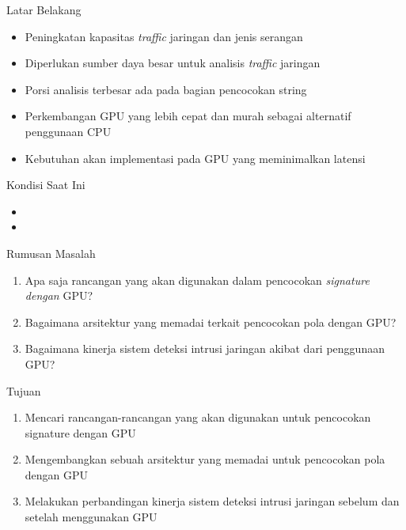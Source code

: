 \documentclass[10pt]{beamer}
\begin{document}
\begin{frame}[fragile]{Latar Belakang}
    \begin{itemize}

        \item Peningkatan kapasitas \emph{traffic} jaringan dan jenis serangan

        \item Diperlukan sumber daya besar untuk analisis \emph{traffic} jaringan

        \item Porsi analisis terbesar ada pada bagian pencocokan string

        \item Perkembangan GPU yang lebih cepat dan murah sebagai alternatif 
        penggunaan CPU
        \item Kebutuhan akan implementasi pada GPU yang meminimalkan latensi

    \end{itemize}
\end{frame}

\begin{frame}[fragile]{Kondisi Saat Ini}
    \begin{itemize}

        \item 

        \item 

    \end{itemize}
\end{frame}

\begin{frame}[fragile]{Rumusan Masalah}
    \begin{enumerate}

        \item Apa saja rancangan yang akan digunakan dalam pencocokan \emph{signature dengan} GPU?

        \item Bagaimana arsitektur yang memadai terkait pencocokan pola dengan GPU?

        \item Bagaimana kinerja sistem deteksi intrusi jaringan akibat dari penggunaan GPU?

    \end{enumerate}
\end{frame}

\begin{frame}[fragile]{Tujuan}
    \begin{enumerate}
        
        \item Mencari rancangan-rancangan yang akan digunakan untuk pencocokan signature dengan GPU
        
        \item Mengembangkan sebuah arsitektur yang memadai untuk pencocokan pola dengan GPU
        
        \item Melakukan perbandingan kinerja sistem deteksi intrusi jaringan sebelum dan setelah menggunakan GPU

    \end{enumerate}
\end{frame}
\end{document}
